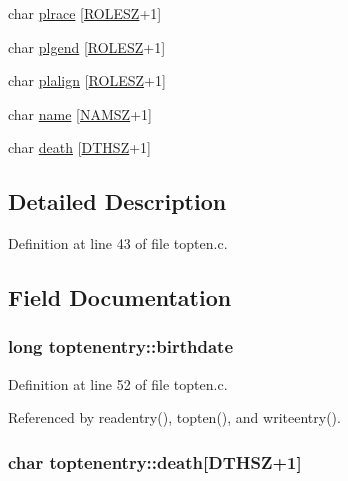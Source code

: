 \begin{DoxyCompactItemize}
char \hyperlink{structtoptenentry_ad8638f544271de3f5d3e21d745fee726}{plrace} \mbox{[}\hyperlink{topten_8c_a2765a7987f7f846aa68856bd97b44ffb}{R\+O\+L\+E\+S\+Z}+1\mbox{]}
\item 
char \hyperlink{structtoptenentry_aac92919a77981b5b61e9dee719c38333}{plgend} \mbox{[}\hyperlink{topten_8c_a2765a7987f7f846aa68856bd97b44ffb}{R\+O\+L\+E\+S\+Z}+1\mbox{]}
\item 
char \hyperlink{structtoptenentry_aee7d9d1fb9de83e94cca805b837079f4}{plalign} \mbox{[}\hyperlink{topten_8c_a2765a7987f7f846aa68856bd97b44ffb}{R\+O\+L\+E\+S\+Z}+1\mbox{]}
\item 
char \hyperlink{structtoptenentry_ae979ed735fbaba2080cd14248c9f8641}{name} \mbox{[}\hyperlink{topten_8c_a8a9f53e88ab074d064538861f55d1f78}{N\+A\+M\+S\+Z}+1\mbox{]}
\item 
char \hyperlink{structtoptenentry_a43fc6492872785e69a78219501d83bb7}{death} \mbox{[}\hyperlink{topten_8c_a04f0d79bd659186506d88c4710898bea}{D\+T\+H\+S\+Z}+1\mbox{]}
\end{DoxyCompactItemize}


\subsection{Detailed Description}


Definition at line 43 of file topten.\+c.



\subsection{Field Documentation}
\hypertarget{structtoptenentry_a3c03a444fb83e6d57b50ad60e178f6d8}{
\subsubsection[{birthdate}]{\setlength{\rightskip}{0pt plus 5cm}long toptenentry\+::birthdate}}\label{structtoptenentry_a3c03a444fb83e6d57b50ad60e178f6d8}


Definition at line 52 of file topten.\+c.



Referenced by readentry(), topten(), and writeentry().

\hypertarget{structtoptenentry_a43fc6492872785e69a78219501d83bb7}{
\subsubsection[{death}]{\setlength{\rightskip}{0pt plus 5cm}char toptenentry\+::death\mbox{[}{\bf D\+T\+H\+S\+Z}+1\mbox{]}}}\label{structtoptenentry_a43fc6492872785e69a78219501d83bb7}


